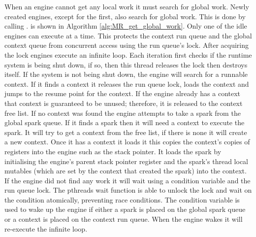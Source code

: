 When an engine cannot get any local work it must search for global work.
Newly created engines, except for the first, also search for global work.
This is done by calling \getglobalwork.
\getglobalwork is shown in Algorithm \ref{alg:MR_get_global_work}.
Only one of the idle engines can execute \getglobalwork at a time.
This protects the context run queue and the global context queue from
concurrent access using the run queue's lock.
After acquiring the lock engines execute an infinite loop.
Each iteration first checks if the runtime system is being shut down,
if so,
then this thread releases the lock then destroys itself.
If the system is not being shut down,
the engine will search for a runnable context.
If it finds a context it releases the run queue lock, loads the context
and jumps to the resume point for the context.
If the engine already has a context that context is guaranteed to be unused;
therefore, it is released to the context free list.
If no context was found the engine attempts to take a spark from the global
spark queue.
If it finds a spark then it will need a context to execute the spark.
It will try to get a context from the free list, if there is none it will
create a new context.
Once it has a context it loads it
this copies the context's copies of registers into the engine such as the
stack pointer.
It loads the spark by initialising the engine's parent stack pointer
register and the spark's thread local mutables
(which are set by the context that created the spark)
into the context.
If the engine did not find any work it will wait using a condition
variable and the run queue lock.
The pthreads wait function is able to unlock the lock and wait on the
condition atomically, preventing race conditions. 
The condition variable is used to wake up the engine if either a spark is
placed on the global spark queue or a context is placed on the context run
queue.
When the engine wakes it will re-execute the infinite loop.


